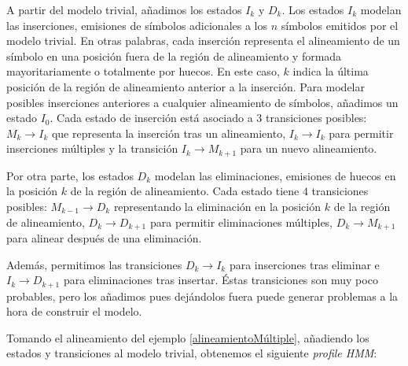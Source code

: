 A partir del modelo trivial, añadimos los estados $I_k$ y $D_k$. Los estados $I_k$ modelan las inserciones, emisiones de símbolos adicionales a los $n$ símbolos emitidos por el modelo trivial. En otras palabras, cada inserción representa el alineamiento de un símbolo en una posición fuera de la región de alineamiento y formada mayoritariamente o totalmente por huecos. En este caso, $k$ indica la última posición de la región de alineamiento anterior a la inserción. Para modelar posibles inserciones anteriores a cualquier alineamiento de símbolos, añadimos un estado $I_0$. Cada estado de inserción está asociado a $3$ transiciones posibles: $M_k\rightarrow I_k$ que representa la inserción tras un alineamiento, $I_k\rightarrow I_k$ para permitir inserciones múltiples y la transición $I_k\rightarrow M_{k+1}$ para un nuevo alineamiento. 

Por otra parte, los estados $D_k$ modelan las eliminaciones, emisiones de huecos en la posición $k$ de la región de alineamiento. Cada estado tiene $4$ transiciones posibles: $M_{k-1}\rightarrow D_k$ representando la eliminación en la posición $k$ de la región de alineamiento, $D_k \rightarrow D_{k+1}$ para permitir eliminaciones múltiples, $D_k\rightarrow M_{k+1}$ para alinear después de una eliminación. 

Además, permitimos las transiciones $D_k \rightarrow I_k$ para inserciones tras eliminar e $I_{k}\rightarrow D_{k+1}$ para eliminaciones tras insertar. Éstas transiciones son muy poco probables, pero los añadimos pues dejándolos fuera puede generar problemas a la hora de construir el modelo.

Tomando el alineamiento del ejemplo \ref{alineamientoMúltiple}, añadiendo los estados y transiciones al modelo trivial, obtenemos el siguiente \textit{profile HMM}:


